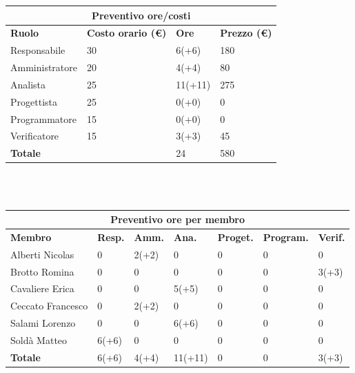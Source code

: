 \documentclass[a4paper, 12pt]{article}
\begin{document}
\begin{center}
	\begin{tabularx}{\textwidth}{|X|X|X|X|}
		\hline
		\multicolumn{4}{|c|}{\textbf{Preventivo ore/costi}}                                      \\
		\hline
		\hline
		\textbf{Ruolo}  & \textbf{Costo orario (\euro)} & \textbf{Ore} & \textbf{Prezzo (\euro)} \\
		\hline
		Responsabile    & 30                            & 6(+6)        & 180                     \\
		\hline
		Amministratore  & 20                            & 4(+4)        & 80                     \\
		\hline
		Analista        & 25                            & 11(+11)      & 275                     \\
		\hline
		Progettista     & 25                            & 0(+0)        & 0                       \\
		\hline
		Programmatore   & 15                            & 0(+0)        & 0                       \\
		\hline
		Verificatore    & 15                            & 3(+3)        & 45                      \\
		\hline
		\hline
		\textbf{Totale} &                               & 24           & 580                     \\
		\hline
	\end{tabularx}\\[8pt]
	\mbox{}\\
\end{center}

\begin{center}
	\begin{tabularx}{\textwidth}{|X|X|X|X|X|X|X|}
		\hline
		\multicolumn{7}{|c|}{\textbf{Preventivo ore per membro}}                                      \\
		\hline
		\hline
		\textbf{Membro}  & \textbf{Resp.} & \textbf{Amm.} & \textbf{Ana.} &
		\textbf{Proget.} & \textbf{Program.} & \textbf{Verif.} \\
		\hline
		Alberti Nicolas    	&0 	&2(+2)	&0	&0	&0	&0	\\
		\hline
		Brotto Romina    	&0 	&0	&0	&0	&0	&3(+3)	\\
		\hline
		Cavaliere Erica    	&0 	&0  &5(+5)  &0 &0 &0	\\
		\hline
		Ceccato Francesco   &0 	&2(+2)  &0  &0 &0 &0	\\
		\hline
		Salami Lorenzo    	&0 	&0  & 6(+6) &0 &0 &0	\\
		\hline
		Soldà Matteo    	&6(+6)	&0  &0  &0 &0 &0	\\
		\hline
		\hline
		\textbf{Totale} 	& 6(+6) & 4(+4) & 11(+11) & 0 & 0 & 3(+3)	\\
		\hline
	\end{tabularx}\\[8pt]
	\mbox{}\\
\end{center}
\end{document}
